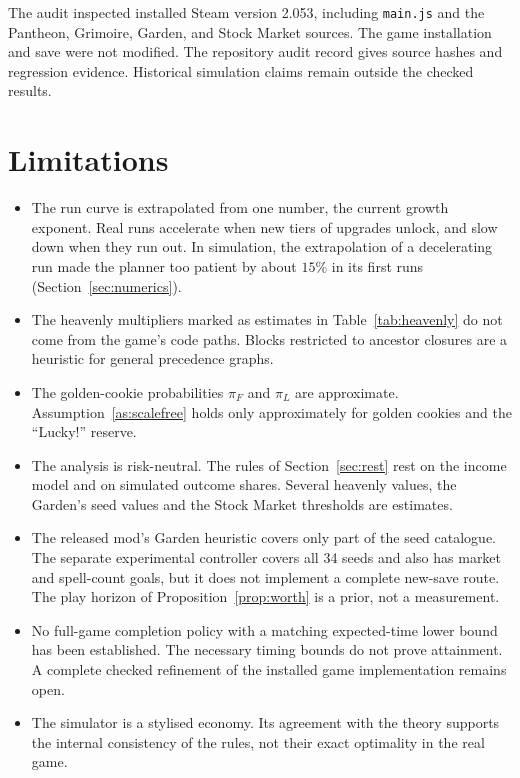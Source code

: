 \documentclass[11pt,a4paper]{article}
\numberwithin{equation}{section}
\theoremstyle{definition}
\theoremstyle{remark}
\newcommand{\Lucky}{\textup{``Lucky!''}}
\begin{document}
The audit inspected installed Steam version 2.053, including \texttt{main.js} and the Pantheon, Grimoire, Garden, and Stock Market sources. The game installation and save were not modified. The repository audit record gives source hashes and regression evidence. Historical simulation claims remain outside the checked results.

\section{Limitations}\label{sec:limitations}
\begin{itemize}
\item The run curve is extrapolated from one number, the current growth exponent. Real runs accelerate when new tiers of upgrades unlock, and slow down when they run out. In simulation, the extrapolation of a decelerating run made the planner too patient by about $15\%$ in its first runs (Section~\ref{sec:numerics}).
\item The heavenly multipliers marked as estimates in Table~\ref{tab:heavenly} do not come from the game's code paths. Blocks restricted to ancestor closures are a heuristic for general precedence graphs.
\item The golden-cookie probabilities $\pi_F$ and $\pi_L$ are approximate. Assumption~\ref{as:scalefree} holds only approximately for golden cookies and the \Lucky{} reserve.
\item The analysis is risk-neutral. The rules of Section~\ref{sec:rest} rest on the income model and on simulated outcome shares. Several heavenly values, the Garden's seed values and the Stock Market thresholds are estimates.
\item The released mod's Garden heuristic covers only part of the seed catalogue. The separate experimental controller covers all 34 seeds and also has market and spell-count goals, but it does not implement a complete new-save route. The play horizon of Proposition~\ref{prop:worth} is a prior, not a measurement.
\item No full-game completion policy with a matching expected-time lower bound has been established. The necessary timing bounds do not prove attainment. A complete checked refinement of the installed game implementation remains open.
\item The simulator is a stylised economy. Its agreement with the theory supports the internal consistency of the rules, not their exact optimality in the real game.
\end{itemize}
\end{document}
